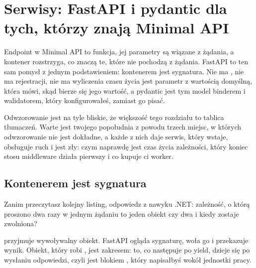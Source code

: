 
\chapter{Serwisy: FastAPI i pydantic dla tych, którzy znają Minimal API}
\label{ch:services}

\noindent
Endpoint w Minimal API to funkcja, jej parametry są wiązane z żądania, a
kontener rozstrzyga, co znaczą te, które nie pochodzą z żądania. FastAPI to
ten sam pomysł z jednym podstawieniem: kontenerem jest sygnatura. Nie ma
, nie ma rejestracji, nie ma wyliczenia czasu życia
\dash{} jest parametr z wartością domyślną, która mówi, skąd bierze się jego
wartość, a pydantic jest tym model binderem i walidatorem, który
konfigurowałeś, zamiast go pisać.

Odwzorowanie jest na tyle bliskie, że większość tego rozdziału to tablica
tłumaczeń. Warte jest twojego popołudnia z powodu trzech miejsc, w których
odwzorowanie nie jest dokładne, a każde z nich daje serwis, który wstaje,
obsługuje ruch i jest zły: czym naprawdę jest czas życia zależności, który
koniec stosu middleware działa pierwszy i co kupuje ci worker.


\section{Kontenerem jest sygnatura}
\label{sec:ch09-depends}

Zanim przeczytasz kolejny listing, odpowiedz z nawyku .NET: zależność, o którą
proszono dwa razy w jednym żądaniu \dash{} to jeden obiekt czy dwa i kiedy
zostaje zwolniona?


\noindent
{} przyjmuje wywoływalny obiekt. FastAPI ogląda sygnaturę, woła go
i przekazuje wynik. Obiekt, który robi , jest zakresem: to, co
następuje po yield, dzieje się po wysłaniu odpowiedzi, czyli jest blokiem
, który napisałbyś wokół jednostki pracy.

